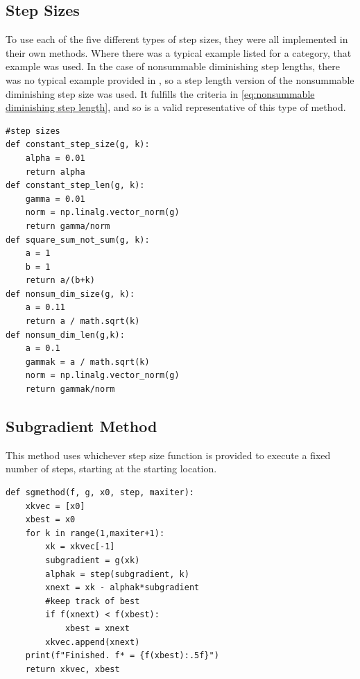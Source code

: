 \documentclass[journal,onecolumn]{IEEEtran}
\begin{document}
\subsection{Step Sizes}
To use each of the five different types of step sizes, they were all implemented in their own methods. Where there was a typical example listed for a category, that example was used. In the case of nonsummable diminishing step lengths, there was no typical example provided in \cite{boydparksubgradients}, so a step length version of the nonsummable diminishing step size was used. It fulfills the criteria in \eqref{eq:nonsummable diminishing step length}, and so is a valid representative of this type of method.
\begin{verbatim}
#step sizes
def constant_step_size(g, k):
    alpha = 0.01
    return alpha
def constant_step_len(g, k):
    gamma = 0.01
    norm = np.linalg.vector_norm(g)
    return gamma/norm
def square_sum_not_sum(g, k):
    a = 1
    b = 1
    return a/(b+k)
def nonsum_dim_size(g, k):
    a = 0.11
    return a / math.sqrt(k)
def nonsum_dim_len(g,k):
    a = 0.1
    gammak = a / math.sqrt(k)
    norm = np.linalg.vector_norm(g)
    return gammak/norm
\end{verbatim}

\subsection{Subgradient Method}
This method uses whichever step size function is provided to execute a fixed number of steps, starting at the starting location.
\begin{verbatim}
def sgmethod(f, g, x0, step, maxiter):
    xkvec = [x0]
    xbest = x0
    for k in range(1,maxiter+1):
        xk = xkvec[-1]
        subgradient = g(xk)
        alphak = step(subgradient, k)
        xnext = xk - alphak*subgradient
        #keep track of best
        if f(xnext) < f(xbest):
            xbest = xnext
        xkvec.append(xnext)
    print(f"Finished. f* = {f(xbest):.5f}")
    return xkvec, xbest
\end{verbatim}
\end{document}
